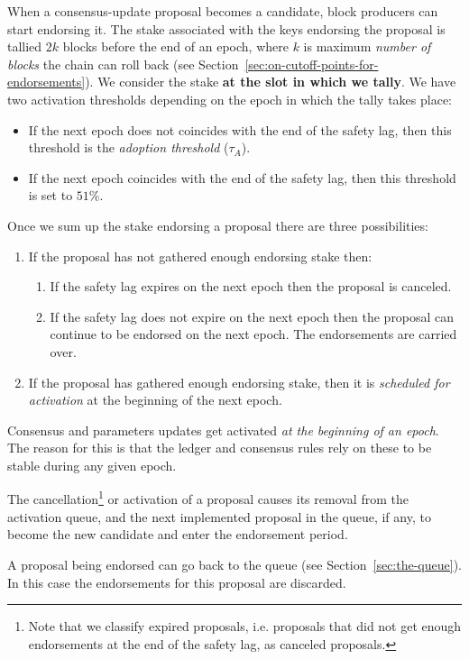 When a consensus-update proposal becomes a candidate, block producers can start
endorsing it. The stake associated with the keys endorsing the proposal is
tallied $2k$ blocks before the end of an epoch, where $k$ is maximum
\emph{number of blocks} the chain can roll back (see
Section~\ref{sec:on-cutoff-points-for-endorsements}). We consider the stake
\textbf{at the slot in which we tally}. We have two activation thresholds
depending on the epoch in which the tally takes place:
\begin{itemize}
\item If the next epoch does not coincides with the end of the safety lag, then
  this threshold is the \emph{adoption threshold} ($\tau_A$).
\item If the next epoch coincides with the end of the safety lag, then this
  threshold is set to $51\%$.
\end{itemize}

Once we sum up the stake endorsing a proposal there are three possibilities:
\begin{enumerate}
\item If the proposal has not gathered enough endorsing stake then:
  \begin{enumerate}
  \item If the safety lag expires on the next epoch then the proposal is
    canceled.
  \item If the safety lag does not expire on the next epoch then the proposal
    can continue to be endorsed on the next epoch. The endorsements are carried
    over.
  \end{enumerate}
\item If the proposal has gathered enough endorsing stake, then it is
  \emph{scheduled for activation} at the beginning of the next epoch.
\end{enumerate}

Consensus and parameters updates get activated \emph{at the beginning of an
  epoch}. The reason for this is that the ledger and consensus rules rely on
these to be stable during any given epoch.

The cancellation\footnote{Note that we classify expired proposals, i.e.
  proposals that did not get enough endorsements at the end of the safety lag,
  as canceled proposals.} or activation of a proposal causes its removal from
the activation queue, and the next implemented proposal in the queue, if any, to
become the new candidate and enter the endorsement period.

A proposal being endorsed can go back to the queue (see
Section~\ref{sec:the-queue}). In this case the endorsements for this proposal
are discarded.

